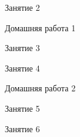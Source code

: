 \begin{class}[number=2]
	\begin{listofex}
		\item Занятие 2
	\end{listofex}
\end{class}

\begin{homework}[number=1]
	\begin{listofex}
		\item Домашняя работа 1
	\end{listofex}
\end{homework}

\begin{class}[number=3]
	\begin{listofex}
		\item Занятие 3 
	\end{listofex}
\end{class}

\begin{class}[number=4]
	\begin{listofex}
		\item Занятие 4
	\end{listofex}
\end{class}

\begin{homework}[number=2]
	\begin{listofex}
		\item Домашняя работа 2
	\end{listofex}
\end{homework}

\begin{class}[number=5]
	\begin{listofex}
		\item Занятие 5
	\end{listofex}
\end{class}

\begin{class}[number=6]
	\begin{listofex}
		\item Занятие 6
	\end{listofex}
\end{class}

